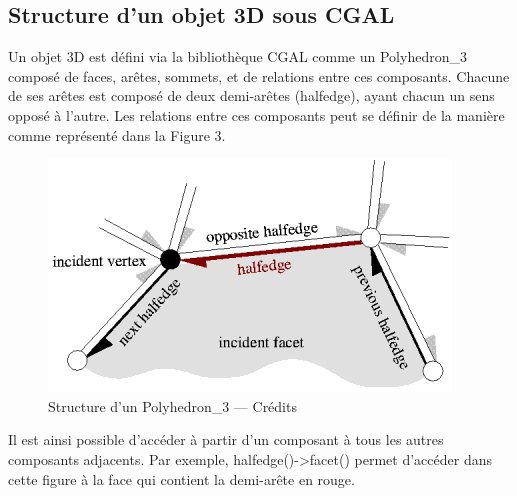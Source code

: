 \documentclass[a4paper,french]{report}
\begin{document}
			\subsection{Structure d'un objet 3D sous CGAL}
				Un objet 3D est défini via la bibliothèque CGAL comme un Polyhedron\_3 composé de faces, arêtes, sommets, et de relations entre ces composants. Chacune de ses arêtes est composé de deux demi-arêtes (halfedge), ayant chacun un sens opposé à l'autre. Les relations entre ces composants peut se définir de la manière comme représenté dans la Figure 3. \par
				\begin{figure}[h]
					\centering
					\includegraphics{halfedge_small.png}
					\caption{Structure d'un Polyhedron\_3 --- Crédits \cite{CGAL} }
				\end{figure}
				Il est ainsi possible d'accéder à partir d'un composant à tous les autres composants adjacents. Par exemple, halfedge()-\textgreater facet() permet d'accéder dans cette figure à la face qui contient la demi-arête en rouge.
				
\end{document}

